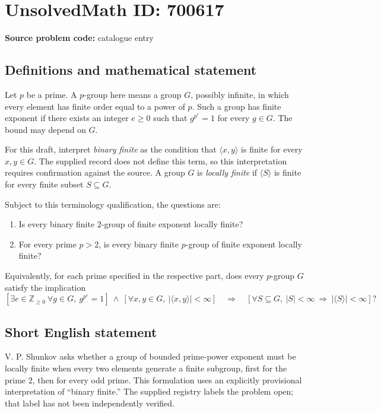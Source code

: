 \documentclass[11pt]{article}
\newcommand{\Z}{\mathbb{Z}}
\begin{document}
\section*{UnsolvedMath ID: 700617}
\textbf{Source problem code:} catalogue entry
\subsection{Definitions and mathematical statement}
Let \(p\) be a prime. A \(p\)-group here means a group \(G\), possibly infinite, in which every element has finite order equal to a power of \(p\). Such a group has finite exponent if there exists an integer \(e\geq 0\) such that \(g^{p^e}=1\) for every \(g\in G\). The bound may depend on \(G\).

For this draft, interpret \emph{binary finite} as the condition that \(\langle x,y\rangle\) is finite for every \(x,y\in G\). The supplied record does not define this term, so this interpretation requires confirmation against the source. A group \(G\) is \emph{locally finite} if \(\langle S\rangle\) is finite for every finite subset \(S\subseteq G\).

Subject to this terminology qualification, the questions are:
\begin{enumerate}
\item[(a)] Is every binary finite \(2\)-group of finite exponent locally finite?
\item[(b)] For every prime \(p>2\), is every binary finite \(p\)-group of finite exponent locally finite?
\end{enumerate}
Equivalently, for each prime specified in the respective part, does every \(p\)-group \(G\) satisfy the implication
\[
\left[\exists e\in\Z_{\geq 0}\ \forall g\in G,\ g^{p^e}=1\right]
\ \land\ 
\left[\forall x,y\in G,\ |\langle x,y\rangle|<\infty\right]
\quad\Longrightarrow\quad
\left[\forall S\subseteq G,\ |S|<\infty\ \Longrightarrow\ |\langle S\rangle|<\infty\right]?
\]
\subsection{Short English statement}
V. P. Shunkov asks whether a group of bounded prime-power exponent must be locally finite when every two elements generate a finite subgroup, first for the prime \(2\), then for every odd prime. This formulation uses an explicitly provisional interpretation of ``binary finite.'' The supplied registry labels the problem open; that label has not been independently verified.
\end{document}
